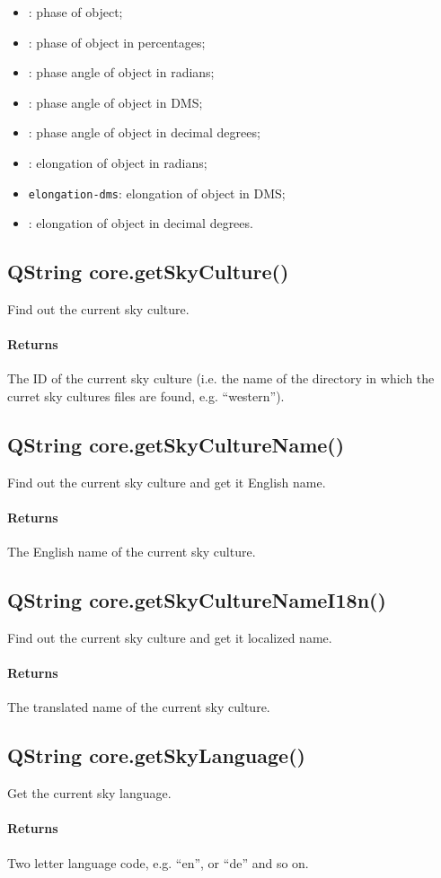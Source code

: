 \begin{itemize}
\item {}: phase of object\footnotemark[2];
\item {}: phase of object in percentages\footnotemark[2];
\item {}: phase angle of object in radians\footnotemark[2];
\item {}: phase angle of object in DMS\footnotemark[2];
\item {}: phase angle of object in decimal degrees\footnotemark[2];
\item {}: elongation of object in radians\footnotemark[2];
\item \texttt{elongation-dms}: elongation of object in DMS\footnotemark[2];
\item {}: elongation of object in decimal degrees\footnotemark[2].
\end{itemize}

\subsection{QString core.getSkyCulture()}
\label{sec:ScriptingAPI:core:getSkyCulture}
Find out the current sky culture.

\paragraph{Returns}
The ID of the current sky culture (i.e. the name of the directory in which the curret sky cultures files are found, e.g. ``western'').

\subsection{QString core.getSkyCultureName()}
\label{sec:ScriptingAPI:core:getSkyCultureName}
Find out the current sky culture and get it English name.

\paragraph{Returns}
The English name of the current sky culture.

\subsection{QString core.getSkyCultureNameI18n()}
\label{sec:ScriptingAPI:core:getSkyCultureNameI18n}
Find out the current sky culture and get it localized name.

\paragraph{Returns}
The translated name of the current sky culture.

\subsection{QString core.getSkyLanguage()}
\label{sec:ScriptingAPI:core:getSkyLanguage}
Get the current sky language.

\paragraph{Returns}
Two letter language code, e.g. ``en'', or ``de'' and so on.